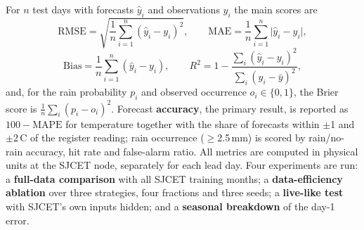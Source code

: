 For $n$ test days with forecasts $\hat{y}_i$ and observations $y_i$ the main scores are
\begin{equation}
\mathrm{RMSE}=\sqrt{\frac{1}{n}\sum_{i=1}^{n}(\hat{y}_i-y_i)^2}, \qquad \mathrm{MAE}=\frac{1}{n}\sum_{i=1}^{n}\lvert\hat{y}_i-y_i\rvert,
\label{eq:rmse}
\end{equation}
\begin{equation}
\mathrm{Bias}=\frac{1}{n}\sum_{i=1}^{n}(\hat{y}_i-y_i), \qquad R^2=1-\frac{\sum_i(\hat{y}_i-y_i)^2}{\sum_i(y_i-\bar{y})^2},
\label{eq:bias}
\end{equation}
and, for the rain probability $p_i$ and observed occurrence $o_i\in\{0,1\}$, the Brier score is $\frac{1}{n}\sum_i(p_i-o_i)^2$. Forecast \textbf{accuracy}, the primary result, is reported as $100-\mathrm{MAPE}$ for temperature together with the share of forecasts within $\pm$1 and $\pm$2\,\textdegree C of the register reading; rain occurrence ($\geq$2.5\,mm) is scored by rain/no-rain accuracy, hit rate and false-alarm ratio. All metrics are computed in physical units at the SJCET node, separately for each lead day. Four experiments are run: a \textbf{full-data comparison} with all SJCET training months; a \textbf{data-efficiency ablation} over three strategies, four fractions and three seeds; a \textbf{live-like test} with SJCET's own inputs hidden; and a \textbf{seasonal breakdown} of the day-1 error.
